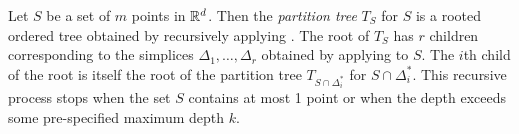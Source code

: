 \documentclass{patmorin}
\begin{document}
%
%
%

Let $S$ be a set of $m$ points in $\mathbb{R}^d$. Then the \emph{partition
tree} $T_S$ for $S$ is a rooted ordered tree obtained by recursively
applying .  The root of $T_S$ has $r$ children
corresponding to the simplices $\Delta_1,\ldots,\Delta_{r}$ obtained
by applying  to $S$. The $i$th child of the
root is itself the root of the partition tree $T_{S\cap\Delta_i^*}$
for $S\cap\Delta_i^*$. This recursive process stops when the set $S$
contains at most 1 point or when the depth exceeds some pre-specified
maximum depth $k$.
\end{document}

